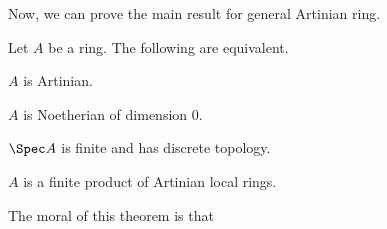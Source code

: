 Now, we can prove the main result for general Artinian ring.
\begin{theorem}
    \label{thm:artinian}
   Let $A$ be a ring. The following are equivalent.
   \begin{alphenum}
    \item $A$ is Artinian.
    \item $A$ is Noetherian of dimension $0$.
    \item $\Spec A$ is finite and has discrete topology.
    \item $A$ is a finite product of Artinian local rings.
   \end{alphenum}
\end{theorem}
The moral of this theorem is that 
\begin{center}
\end{center}
